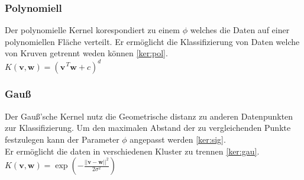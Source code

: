 \documentclass[10pt,a4paper]{scrartcl}
\begin{document}
                \subsubsection{Polynomiell}
                Der polynomielle Kernel korespondiert zu einem $\phi$ welches die Daten auf einer polynomiellen Fläche verteilt.
                Er ermöglicht die Klassifizierung von Daten welche von Kruven getrennt weden können \ref{ker:pol}. \\
                $K(\boldsymbol{v}, \boldsymbol{w}) = (\boldsymbol{v}^{\, T} \boldsymbol{w} + c)^{d}$
                
                \subsubsection{Gauß}
                Der Gauß'sche Kernel nutz die Geometrische distanz zu anderen Datenpunkten zur Klassifizierung.
                Um den maximalen Abstand der zu vergleichenden Punkte festzulegen kann der Parameter $\phi$ angepasst werden \ref{ker:sig}. \\
                Er ermöglicht die daten in verschiedenen Kluster zu trennen \ref{ker:gau}. \\
                $K(\boldsymbol{v}, \boldsymbol{w}) = \exp(-\frac{\lvert\lvert\boldsymbol{v} - \boldsymbol{w}\rvert\rvert^{2}}{2\sigma^{2}})$ \\\
                
\end{document}
